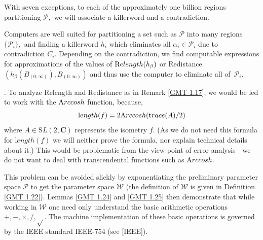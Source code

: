 \begin{summary}  \label{GMT 1.19} With seven exceptions,  to each of the approximately one
billion regions partitioning ${\mathcal P},$ we will
associate a killerword and a contradiction.  \end{summary} 

\begin{remark}  \label{GMT 1.20} Computers are well suited for partitioning a set such as ${\mathcal P}$
into many regions $\{{\mathcal P}_i \},$ and finding a
killerword $h_i$ which eliminates all $\alpha_i \in {\mathcal P}_i $ due to contradiction $C_i.$
Depending on the contradiction, we find
computable expressions  for approximations of the values of
${\textrm Relength}(h_\beta)$ or Redistance$(h_\beta(B_{(0;\infty)}), B_{(0;\infty)})$ and
thus use the computer to eliminate all of~${\mathcal P}_i .$ 
\end{remark}

\begin{remark}\label{GMT 1.21}.
	To analyze Relength and Redistance as in Remark \ref{GMT 1.17}, we would be led to work with the ${\textrm Arccosh}$ function, because, 
$${\mathrm length}(f) = 2{\textrm Arccosh}({\mathrm trace}(A)/2)$$
where $A\in {\mathrm SL}(2,{\mathbf C})$ represents the isometry $f.$
(As we do not need this formula for ${\mathrm length}(f)$ we will neither prove the formula, nor explain technical details about it.)  This would be problematic from the view-point of error analysis---we do not want to deal with transcendental functions such as ${\textrm Arccosh}.$  

This problem can be  avoided slickly by exponentiating the preliminary parameter space ${\mathcal P}$ to get the parameter space ${\mathcal W}$ (the
	definition of ${\mathcal W}$ is given in Definition \ref{GMT 1.22}).   Lemmas \ref{GMT 1.24} and \ref{GMT 1.25} then demonstrate
that while working in ${\mathcal W}$ one need only
understand the basic arithmetic operations $+, -, \times, /, \sqrt{}$.
The machine implementation of these basic operations is governed by the IEEE standard IEEE-754 (see [IEEE]).
\end{remark}

